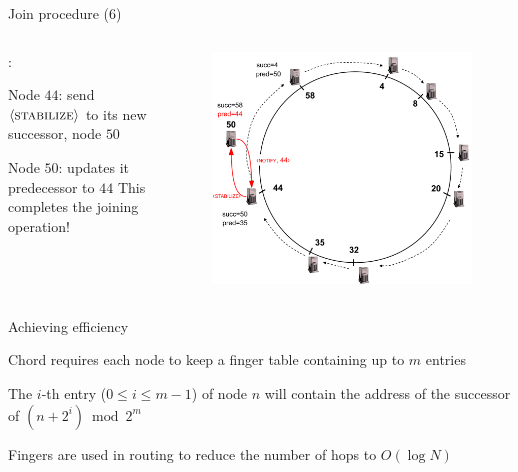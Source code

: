\begin{frame}{Join procedure (6)}

\begin{columns}
\begin{column}{0.4\textwidth}
:
\BI
\item Node $44$: send $\langle \textsc{stabilize} \rangle$ to its new successor, node $50$ 
\item Node $50$: updates it predecessor to $44$
\EI
This completes the joining operation!

\end{column}
\begin{column}{0.6\textwidth}
\begin{figure}
\includegraphics[width=1.0\textwidth]{figs/10/chord-example7}
\end{figure}
\end{column}
\end{columns}

\end{frame}

\begin{frame}{Achieving efficiency}

\BIL
\item Chord requires each node to keep a \alert{finger table} containing 
up to $m$ entries
\item The $i$-th entry ($0 \leq i \leq m-1$) of node $n$ will contain the 
address of the successor of $(n + 2^{i}) \bmod 2^m$
\item Fingers are used in routing to reduce the number of hops to $O(\log N)$
\EIL
\end{frame}

